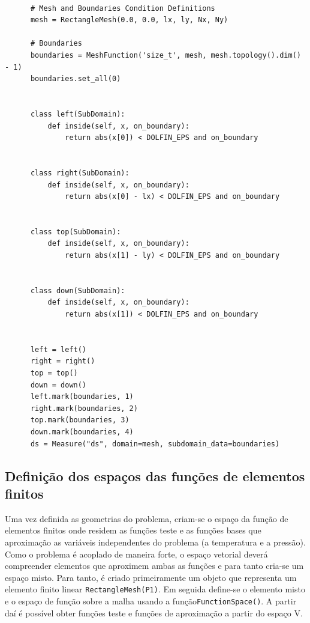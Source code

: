     \begin{verbatim}

      # Mesh and Boundaries Condition Definitions
      mesh = RectangleMesh(0.0, 0.0, lx, ly, Nx, Ny)

      # Boundaries
      boundaries = MeshFunction('size_t', mesh, mesh.topology().dim() - 1)
      boundaries.set_all(0)


      class left(SubDomain):
          def inside(self, x, on_boundary):
              return abs(x[0]) < DOLFIN_EPS and on_boundary
      

      class right(SubDomain):
          def inside(self, x, on_boundary):
              return abs(x[0] - lx) < DOLFIN_EPS and on_boundary


      class top(SubDomain):
          def inside(self, x, on_boundary):
              return abs(x[1] - ly) < DOLFIN_EPS and on_boundary


      class down(SubDomain):
          def inside(self, x, on_boundary):
              return abs(x[1]) < DOLFIN_EPS and on_boundary


      left = left()
      right = right()
      top = top()
      down = down()
      left.mark(boundaries, 1)
      right.mark(boundaries, 2)
      top.mark(boundaries, 3)
      down.mark(boundaries, 4)
      ds = Measure("ds", domain=mesh, subdomain_data=boundaries)
    \end{verbatim} 

    \subsection{Definição dos espaços das funções de elementos finitos}
    Uma vez definida as geometrias do problema, criam-se o espaço da função de
    elementos finitos onde residem as funções teste e as funções bases que
    aproximação as variáveis independentes do problema (a temperatura e a
    pressão). Como o problema é acoplado de maneira forte, o espaço vetorial
    deverá compreender elementos que aproximem ambas as funções e para tanto
    cria-se um espaço misto. Para tanto, é criado primeiramente um objeto que
    representa um elemento finito linear
    \texttt{RectangleMesh(P1)}. Em seguida define-se o
    elemento misto e o espaço de função sobre a malha usando a
    função\texttt{FunctionSpace()}. A partir daí é
    possível obter funções teste e funções de aproximação a partir do espaço V.  
    
